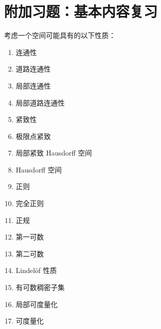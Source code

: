 \section*{附加习题：基本内容复习}

考虑一个空间可能具有的以下性质：
\begin{enumerate}
\item 连通性
\item 道路连通性
\item 局部连通性
\item 局部道路连通性
\item 紧致性
\item 极限点紧致
\item 局部紧致 Hausdorff 空间
\item Hausdorff 空间
\item 正则
\item 完全正则
\item 正规
\item 第一可数
\item 第二可数
\item Lindelöf 性质
\item 有可数稠密子集
\item 局部可度量化
\item 可度量化
\end{enumerate}

